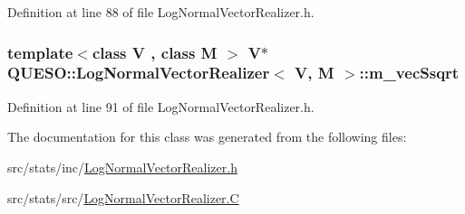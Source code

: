 Definition at line 88 of file Log\-Normal\-Vector\-Realizer.\-h.

\hypertarget{class_q_u_e_s_o_1_1_log_normal_vector_realizer_ad714ba417a345d76f32d9af389b4dccd}{
\subsubsection[{m\-\_\-vec\-Ssqrt}]{\setlength{\rightskip}{0pt plus 5cm}template$<$class V , class M $>$ V$\ast$ {\bf Q\-U\-E\-S\-O\-::\-Log\-Normal\-Vector\-Realizer}$<$ V, M $>$\-::m\-\_\-vec\-Ssqrt\hspace{0.3cm}{\ttfamily [private]}}}\label{class_q_u_e_s_o_1_1_log_normal_vector_realizer_ad714ba417a345d76f32d9af389b4dccd}


Definition at line 91 of file Log\-Normal\-Vector\-Realizer.\-h.



The documentation for this class was generated from the following files\-:\begin{DoxyCompactItemize}
\item 
src/stats/inc/\hyperlink{_log_normal_vector_realizer_8h}{Log\-Normal\-Vector\-Realizer.\-h}\item 
src/stats/src/\hyperlink{_log_normal_vector_realizer_8_c}{Log\-Normal\-Vector\-Realizer.\-C}\end{DoxyCompactItemize}

